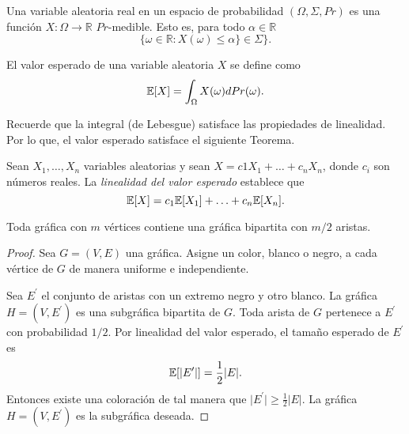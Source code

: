 \begin{definition}
  Una variable aleatoria real en un espacio de probabilidad $(\Omega,
  \Sigma, Pr)$ es una
  función $X: \Omega \rightarrow \mathbb R$ $Pr$-medible. Esto es,
  para todo $\alpha \in \mathbb R$
$$\{\omega \in \mathbb R: X(\omega) \le \alpha \} \in \Sigma \}.$$
\end{definition}

\begin{definition}
El valor esperado de una variable aleatoria $X$ se define como
$$\mathbb{E}[X] = \int_{\Omega} X(\omega) d Pr(\omega).$$
\end{definition}

Recuerde que la integral (de Lebesgue) satisface las propiedades de
linealidad. Por lo que, el valor esperado satisface el siguiente Teorema.

\begin{theorem}
Sean $X_1, \ldots, X_n$ variables aleatorias y sean $X = c1 X_1 +
\ldots + c_n X_n$, donde $c_i$ son números reales. La
\textit{linealidad del valor esperado} establece que
$$ \mathbb{E}[X] = c_1 \mathbb{E}[X_1] + \ldots + c_n \mathbb{E}[X_n]. $$
\end{theorem}

\begin{theorem}
Toda gráfica con $m$ vértices contiene una gráfica bipartita con $m
/ 2$ aristas.
\end{theorem}
\begin{proof}
Sea $G = (V, E)$ una gráfica. Asigne un color, blanco o negro, a
cada vértice de $G$  de manera uniforme e independiente.

Sea $E^\prime$ el conjunto de aristas con un extremo negro y otro
blanco. La gráfica $H = (V, E^\prime)$ es una subgráfica bipartita de $G$.
Toda arista de $G$ pertenece a $E^\prime$ con probabilidad $1/2$.
Por linealidad del valor esperado, el tamaño esperado de $E^\prime$ es
$$\mathbb{E}[\vert E^\prime \vert] = \frac{1}{2} \vert E \vert.$$
Entonces existe una coloración de tal manera que $\vert E^\prime
\vert \ge \frac{1}{2}\vert E \vert$. La gráfica $H = (V, E^\prime)$
es la subgráfica deseada.
\end{proof}

%

